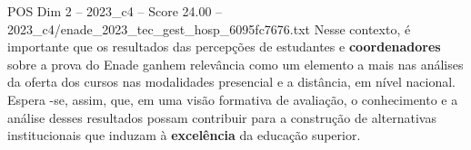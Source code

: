 \begin{textsample}{POS Dim 2 – 2023\_c4 – Score 24.00 – 2023\_c4/enade\_2023\_tec\_gest\_hosp\_6095fc7676.txt}
Nesse contexto, é importante que os resultados das percepções de estudantes e \textbf{coordenadores} sobre a prova do Enade ganhem relevância como um elemento a mais nas análises da oferta dos cursos nas modalidades presencial e a distância, em nível nacional.
Espera -se, assim, que, em uma visão formativa de avaliação, o conhecimento e a análise desses resultados possam contribuir para a construção de alternativas institucionais que induzam à \textbf{excelência} da educação superior.

\end{textsample}
